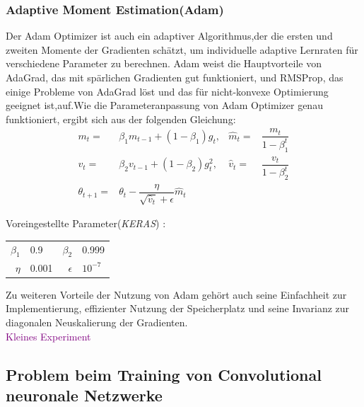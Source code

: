\documentclass[12pt,a4paper]{scrartcl}
\numberwithin{equation}{section}
\begin{document}
\subsubsection{Adaptive Moment Estimation(Adam)}
Der Adam\cite{adam} Optimizer ist auch ein adaptiver Algorithmus,der die ersten und zweiten Momente der Gradienten schätzt, um individuelle adaptive Lernraten für verschiedene Parameter zu berechnen.
Adam weist die Hauptvorteile von AdaGrad, das mit spärlichen Gradienten gut funktioniert, und RMSProp, das einige Probleme von AdaGrad löst und das für nicht-konvexe Optimierung geeignet ist,auf.Wie die Parameteranpassung von Adam Optimizer genau funktioniert, ergibt sich aus der folgenden Gleichung: 
\begin{equation}\label{ADAM}
\begin{aligned}
m_{t}=& \beta_{1}m_{t-1}+(1-\beta_{1})g_{t}, &  \widehat{m}_{t} =& \dfrac{m_{t}}{1-\beta_{1}^t}\\
v_{t}=& \beta_{2}v_{t-1}+(1-\beta_{2})g^2_t,&\widehat{v}_{t} =&\dfrac{v_t}{1-\beta_{2}^t}\\
\theta_{t+1} =& \theta_{t} -\dfrac{\eta}{\sqrt{\widehat{v}_{t}}+\epsilon}\widehat{m}_{t}
\end{aligned}
\end{equation}
\begin{center}
	Voreingestellte Parameter(\textit{KERAS}) :
	\begin{tabular}{r@{: }l r@{: }l}
		$ \beta_{1}$ & 0.9 &$ \beta_{2} $& 0.999\\
		$ \eta$& 0.001& $ \epsilon $ & $ 10^{-7} $
	\end{tabular}
\end{center}

Zu weiteren Vorteile der Nutzung von Adam gehört auch seine Einfachheit zur Implementierung, effizienter Nutzung der Speicherplatz und seine Invarianz zur diagonalen Neuskalierung der Gradienten.
\\ \textcolor{purple}{Kleines Experiment}


\subsection{Problem beim Training von  Convolutional   neuronale Netzwerke}
\end{document}
